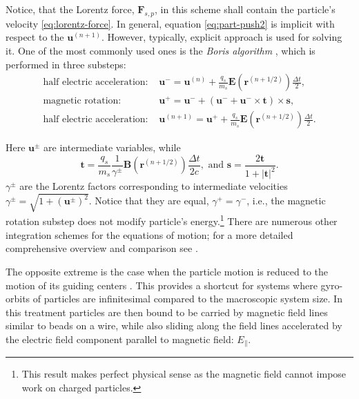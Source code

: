\noindent Notice, that the Lorentz force, $\bm{F}_{s,p}$, in this scheme shall contain the particle's velocity \eqref{eq:lorentz-force}. In general, equation \eqref{eq:part-push2} is implicit with respect to the $\bm{u}^{(n+1)}$. However, typically, explicit approach is used for solving it. One of the most commonly used ones is the \emph{Boris algorithm} \citep{Boris1970}, which is performed in three substeps:
\begin{equation}
\label{eq:num-boris}
  \begin{aligned}
    \textrm{half electric acceleration:  }&\bm{u}^- = \bm{u}^{(n)} + \frac{q_s}{m_s}\bm{E}(\bm{r}^{(n+1/2)})\frac{\Delta t}{2}, \\
    \textrm{magnetic rotation:  }& \bm{u}^+  = \bm{u}^- + (\bm{u}^-+\bm{u}^-\times \bm{t})\times\bm{s},\\
    \textrm{half electric acceleration:  }&\bm{u}^{(n+1)} = \bm{u}^+ + \frac{q_s}{m_s}\bm{E}(\bm{r}^{(n+1/2)})\frac{\Delta t}{2}.
  \end{aligned}
\end{equation}

\noindent Here $\bm{u}^\pm$ are intermediate variables, while
\begin{equation}
  \bm{t} = \frac{q_s}{m_s}\frac{1}{\gamma^\pm }\bm{B}(\bm{r}^{(n+1/2)}) \frac{\Delta t}{2 c}, \textrm{ and } \bm{s} = \frac{2\bm{t}}{1 + |\bm{t}|^2}.
\end{equation}
\noindent $\gamma^\pm$ are the Lorentz factors corresponding to intermediate velocities $\gamma^\pm = \sqrt{1 + (\bm{u}^{\pm})^2}$. Notice that they are equal, $\gamma^+ = \gamma^-$, i.e., the magnetic rotation substep does not modify particle's energy.\footnote{This result makes perfect physical sense as the magnetic field cannot impose work on charged particles.} There are numerous other integration schemes for the equations of motion; for a more detailed comprehensive overview and comparison see \cite{2018ApJS..235...21R}.

The opposite extreme is the case when the particle motion is reduced to the motion of its guiding centers \citep[\emph{guiding center approximation}, GCA; see, e.g.,][]{1963RvGSP...1..283N}. This provides a shortcut for systems where gyro-orbits of particles are infinitesimal compared to the macroscopic system size. In this treatment particles are then bound to be carried by magnetic field lines similar to beads on a wire, while also sliding along the field lines accelerated by the electric field component parallel to magnetic field: $E_\parallel$. 

